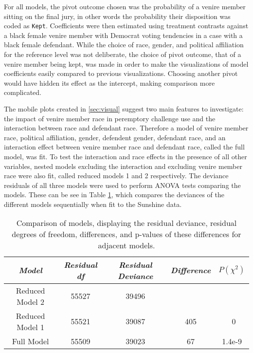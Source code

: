 For all models, the pivot outcome chosen was the probability of a
venire member sitting on the final jury, in other words the probability their disposition was coded as \texttt{Kept}. Coefficients were
then estimated using treatment contrasts against a black female venire member with Democrat voting tendencies in a case with a black female
defendant. While the choice of race, gender, and political affiliation for the reference level was not deliberate, the choice of pivot outcome, that of a venire member being kept, was made in order to make the visualizations of model coefficients easily compared to previous visualizations. Choosing another pivot would have hidden its effect as the intercept, making comparison more complicated.

The mobile plots created in \ref{sec:visual} suggest two main features
to investigate: the impact of venire member race in peremptory
challenge use and the interaction between race and
defendant race. Therefore a model of venire member race, political affiliation,
gender, defendent gender, defendant race, and an interaction effect
between venire member race and defendant race, called the full model,
was fit. To test the interaction and race effects in the presence of
all other variables, nested models excluding the interaction and excluding venire member race were also fit, called reduced models 1 and 2 respectively. The deviance residuals of all three models were used to perform ANOVA tests comparing the models. These can be see in Table \ref{tab:modcomp}, which compares the deviances of the different models sequentially when fit to the Sunshine data.

\begin{table}[h!]
  \centering
  \caption[Nested ANOVA Table Demonstrating the Importance of
  Race]{\footnotesize Comparison of models, displaying the residual deviance, residual degrees of freedom, differences, and p-values of these
    differences for adjacent models.}
  \label{tab:modcomp}
  \begin{tabular}{|c|c|c|c|c|} \hline
    \textit{Model} & \textit{Residual df} & \textit{Residual Deviance} & \textit{Difference} & $P(\chi^2)$ \\ \hline
    Reduced Model 2 & 55527 & 39496 &  &  \\
    Reduced Model 1 & 55521 & 39087 & 405 & ~0 \\
    Full Model & 55509 & 39023 & 67 & 1.4e-9 \\ \hline
  \end{tabular}
\end{table}

